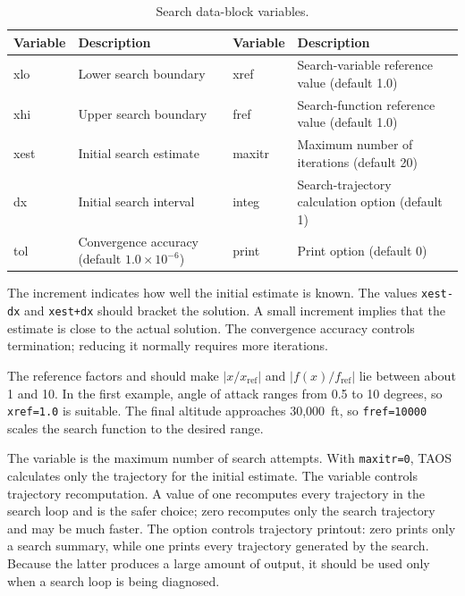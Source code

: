\begin{table}[htbp]
  \centering
  \caption{Search data-block variables.}
  \label{tab:search-control-variables}
  \small
  \begin{tabularx}{0.98\linewidth}{@{}>{\ttfamily}lX>{\ttfamily}lX@{}}
    \toprule
    \normalfont Variable & Description & \normalfont Variable & Description \\
    \midrule
    xlo & Lower search boundary & xref & Search-variable reference value (default 1.0) \\
    xhi & Upper search boundary & fref & Search-function reference value (default 1.0) \\
    xest & Initial search estimate & maxitr & Maximum number of iterations (default 20) \\
    dx & Initial search interval & integ & Search-trajectory calculation option (default 1) \\
    tol & Convergence accuracy (default $1.0\times10^{-6}$) & print & Print option (default 0) \\
    \bottomrule
  \end{tabularx}
\end{table}

The increment  indicates how well the initial estimate is known. The
values \texttt{xest-dx} and \texttt{xest+dx} should bracket the solution. A small
increment implies that the estimate is close to the actual solution. The convergence
accuracy  controls termination; reducing it normally requires more
iterations.

The reference factors  and  should make
$|x/x_{\mathrm{ref}}|$ and $|f(x)/f_{\mathrm{ref}}|$ lie between about 1 and 10. In
the first example, angle of attack ranges from 0.5 to 10 degrees, so
\texttt{xref=1.0} is suitable. The final altitude approaches 30,000~ft, so
\texttt{fref=10000} scales the search function to the desired range.

The variable  is the maximum number of search attempts. With
\texttt{maxitr=0}, TAOS calculates only the trajectory for the initial estimate. The
 variable controls trajectory recomputation. A value of one recomputes
every trajectory in the search loop and is the safer choice; zero recomputes only the
search trajectory and may be much faster. The  option controls
trajectory printout: zero prints only a search summary, while one prints every
trajectory generated by the search. Because the latter produces a large amount of
output, it should be used only when a search loop is being diagnosed.

